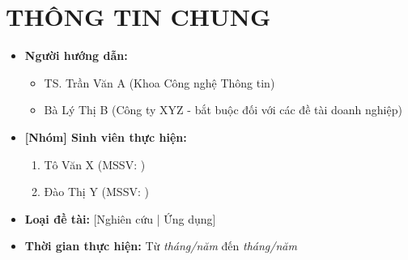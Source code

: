 \documentclass{article}[14pt]
\begin{document}
\Large
\section{THÔNG TIN CHUNG}
\begin{itemize}[label = {}]

	\item \textbf{Người hướng dẫn:}
	      \begin{itemize}
		      \item TS. Trần Văn A (Khoa Công nghệ Thông tin)
		      \item Bà Lý Thị B (Công ty XYZ - bắt buộc đối với các đề tài doanh nghiệp)
	      \end{itemize}{}

	\item \textbf{[Nhóm] Sinh viên thực hiện:}

	      \begin{enumerate}

		      \item Tô Văn X (MSSV: )
		      \item Đào Thị Y (MSSV: )
	      \end{enumerate}

	\item \textbf{Loại đề tài:} [Nghiên cứu | Ứng dụng]

	\item \textbf{Thời gian thực hiện:} Từ \textit{tháng/năm} đến \textit{tháng/năm}

\end{itemize}

\pagebreak
\end{document}
